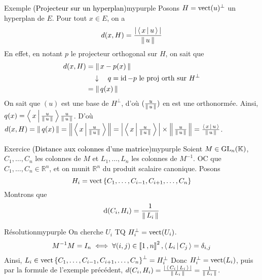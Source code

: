         \begin{omed}{Exemple \textcolor{black}{(Projecteur sur un hyperplan)}}{mypurple}
            Posons $H = \operatorname{vect}(u)^{\perp}$ un hyperplan de $E$. Pour tout $x \in E$, on a 
            \[ d(x,H) = \frac{\left\lvert \,\left<\,x\,\middle|\,u\,\right> \, \right\rvert}{\left\lVert \,u \, \right\rVert} \]    
            En effet, en notant $p$ le projecteur orthogonal sur $H$, on sait que 
            \begin{align*}
                d(x,H)
                &= \left\lVert \,x - p(x) \, \right\rVert \\
                &\quad \downarrow \quad q = \operatorname{id} - p \text{ le proj orth sur } H^{\perp} \\
                &= \left\lVert \,q(x) \, \right\rVert
            \end{align*}
            On sait que $(u)$ est une base de $H^{\perp}$, d’où $(\frac{u}{\left\lVert \,u \, \right\rVert})$ en est une orthonormée. Ainsi, $q(x) = \left<\,x\,\middle|\,\frac{u}{\left\lVert \,u \, \right\rVert}\,\right> \frac{u}{\left\lVert \,u \, \right\rVert}$. D’où $d(x,H) = \left\lVert \,q(x) \, \right\rVert = \left\lVert \,\left<\,x\,\middle|\,\frac{u}{\left\lVert \,u \, \right\rVert}\,\right> \, \right\rVert = \left\lvert \,\left<\,x\,\middle|\,\frac{u}{\left\lVert \,u \, \right\rVert}\,\right> \, \right\rvert\times \left\lVert \,\frac{u}{\left\lVert \,u \, \right\rVert} \, \right\rVert = \frac{\left<\,x\,\middle|\,u\,\right>}{\left\lVert \,u \, \right\rVert}$.
        \end{omed}

        \begin{omed}{Exercice \textcolor{black}{(Distance aux colonnes d’une matrice)}}{mypurple}
            Soient $M \in \operatorname{GL}_n(\mathbb{K})$, $C_1,\ldots,C_n$ les colonnes de $M$ et $L_1,\ldots,L_n$ les colonnes de $M^{-1}$. OC que $C_1,\ldots, C_n \in \mathbb{R}^n$, et on munit $\mathbb{R}^n$ du produit scalaire canonique. Posons 
            \[ H_i = \operatorname{vect}\left\{C_1,\ldots, C_{i-1}, C_{i+1}, \ldots, C_n\right\} \]   
            Montrons que 
            \[ \operatorname{d}(C_i, H_i) = \frac{1}{\left\lVert \,L_i \, \right\rVert} \]
        \end{omed}

        \begin{demo}{Résolution}{mypurple}
            On cherche $U_i$ TQ $H_i^{\perp} = \operatorname{vect}(U_i)$. 
            \begin{align*}
                M^{-1} M = I_n 
                &\iff \forall (i,j) \in \left\llbracket 1 \, , n \right\rrbracket^2, \left<\,L_i\,\middle|\,C_j\,\right> = \delta_{i,j} \\
            \end{align*}
            Ainsi, $L_i \in \operatorname{vect}\left\{C_1,\ldots,C_{i-1},C_{i+1},\ldots,C_n\right\}^{\perp} = H_i^{\perp}$
            Donc $H_i^{\perp} = \operatorname{vect}(L_i)$, puis par la formule de l’exemple précédent, $d(C_i,H_i) = \frac{\left\lvert \,\left<\,C_i\,\middle|\,L_i\,\right> \, \right\rvert}{\left\lVert \,L_i \, \right\rVert} = \frac{1}{\left\lVert \,L_i \, \right\rVert}$.
        \end{demo}

